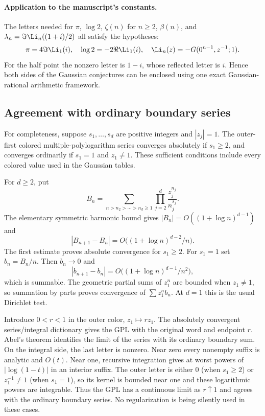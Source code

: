 \paragraph{Application to the manuscript's constants.}
The letters needed for $\pi$, $\log2$, $\zeta(n)$ for $n\geq2$,
$\beta(n)$, and $\lambda_n=\Im\Li_n((1+i)/2)$ all satisfy the hypotheses:
\[
 \pi=4\Im\Li_1(i),\quad \log2=-2\Re\Li_1(i),\quad
 \Li_n(z)=-G(0^{n-1},z^{-1};1).
\]
For the half point the nonzero letter is $1-i$, whose reflected letter
is $i$. Hence both sides of the Gaussian conjectures can be enclosed
using one exact Gaussian-rational arithmetic framework.

\subsection{Agreement with ordinary boundary series}

For completeness, suppose $s_1,\ldots,s_d$ are positive integers and
$|z_j|=1$. The outer-first colored multiple-polylogarithm series converges
absolutely if $s_1\geq2$, and converges ordinarily if $s_1=1$ and
$z_1\ne1$. These sufficient conditions include every colored value used
in the Gaussian tables.

For $d\geq2$, put
\[
 B_n=\sum_{n>n_2>\cdots>n_d\geq1}
       \prod_{j=2}^d\frac{z_j^{n_j}}{n_j^{s_j}}.
\]
The elementary symmetric harmonic bound gives
$|B_n|=O((1+\log n)^{d-1})$ and
\[
 |B_{n+1}-B_n|
   =O\bigl((1+\log n)^{d-2}/n\bigr).
\]
The first estimate proves absolute convergence for $s_1\geq2$.
For $s_1=1$ set $b_n=B_n/n$. Then $b_n\to0$ and
\[
 |b_{n+1}-b_n|
    =O\bigl((1+\log n)^{d-1}/n^2\bigr),
\]
which is summable. The geometric partial sums of $z_1^n$ are bounded
when $z_1\ne1$, so summation by parts proves convergence of
$\sum z_1^n b_n$. At $d=1$ this is the usual Dirichlet test.

Introduce $0<r<1$ in the outer color, $z_1\mapsto rz_1$. The absolutely
convergent series/integral dictionary gives the GPL with the original
word and endpoint $r$. Abel's theorem identifies the limit of the
series with its ordinary boundary sum. On the integral side, the last
letter is nonzero. Near zero every nonempty suffix is analytic and
$O(t)$. Near one, recursive integration gives at worst powers of
$|\log(1-t)|$ in an interior suffix. The outer letter is either $0$
(when $s_1\geq2$) or $z_1^{-1}\ne1$ (when $s_1=1$), so its kernel is
bounded near one and these logarithmic powers are integrable. Thus the
GPL has a continuous limit as $r\uparrow1$ and agrees with the ordinary
boundary series. No regularization is being silently used in these
cases.
